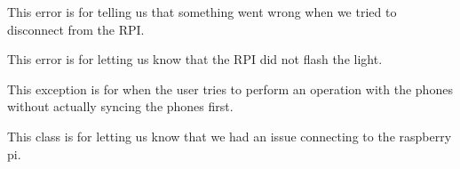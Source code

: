 \documentclass[letterpaper,10pt,english]{sphinxmanual}
\begin{document}
\begin{fulllineitems}
\label{\detokenize{index:src.Controllers.Exceptions.FailedDisconnectException}}
This error is for telling us that something went wrong when we tried to disconnect from the RPI.

\end{fulllineitems}


\begin{fulllineitems}
\label{\detokenize{index:src.Controllers.Exceptions.FailedRPIFlashException}}
This error is for letting us know that the RPI did not flash the light.

\end{fulllineitems}


\begin{fulllineitems}
\label{\detokenize{index:src.Controllers.Exceptions.PhonesNotSyncedException}}
This exception is for when the user tries to perform an operation with the phones without actually
syncing the phones first.

\end{fulllineitems}


\begin{fulllineitems}
\label{\detokenize{index:src.Controllers.Exceptions.RPINotConnectedException}}
This class is for letting us know that we had an issue connecting to the raspberry pi.

\end{fulllineitems}
\end{document}
